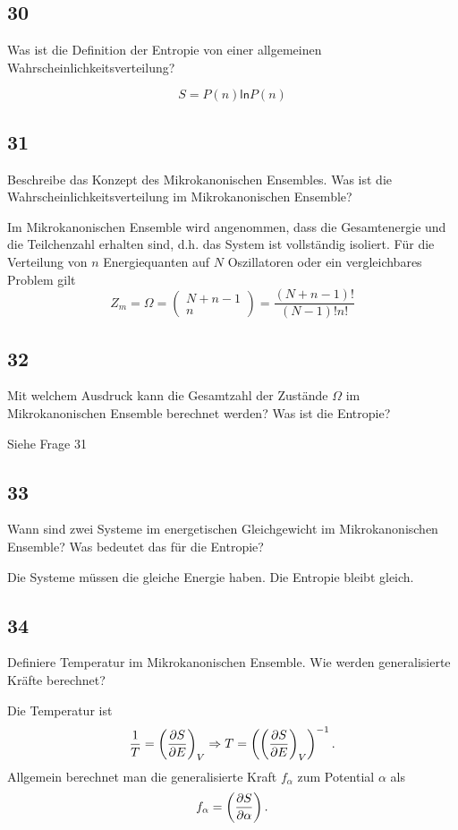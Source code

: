 \documentclass[12pt,a4paper]{report}
\newcommand{\logn}{\mathsf{ln}}
\newcommand{\partdd}[2]{\ensuremath {\left(\frac{\partial #1}{\partial #2}}\right)}
\newcommand{\partddd}[3]{\ensuremath {\left(\frac{\partial #1}{\partial #2}}\right)_{#3}}
\newcommand{\binkoef}[2]{\left(\begin{array}{c}{#1}\\{#2}\end{array}\right)}
\newenvironment{myfrag}{\begin{it}}{\end{it}\vspace{3mm}\par}
\numberwithin{equation}{section}
\begin{document}
\subsection{30}
\begin{myfrag}
Was ist die Definition der Entropie von einer allgemeinen Wahrscheinlichkeitsverteilung?
\end{myfrag}
\begin{equation}
	S=P(n)\logn P(n)
\end{equation}
\subsection{31}
\begin{myfrag}
Beschreibe das Konzept des Mikrokanonischen Ensembles. Was ist die
Wahrscheinlichkeitsverteilung im Mikrokanonischen Ensemble?
\end{myfrag}
Im Mikrokanonischen Ensemble wird angenommen, dass die Gesamtenergie und die Teilchenzahl erhalten sind, d.h. das System ist vollständig isoliert. Für die Verteilung von $n$ Energiequanten auf $N$ Oszillatoren oder ein vergleichbares Problem gilt
\begin{equation}
	Z_m=\Omega=\binkoef{N+n-1}{n}=\frac{(N+n-1)!}{(N-1)!n!}
\end{equation}
\subsection{32}
\begin{myfrag}
Mit welchem Ausdruck kann die Gesamtzahl der Zustände $\Omega$ im
Mikrokanonischen Ensemble berechnet werden? Was ist die Entropie?
\end{myfrag}
Siehe Frage 31 %
\subsection{33}
\begin{myfrag}
Wann sind zwei Systeme im energetischen Gleichgewicht im Mikrokanonischen
Ensemble? Was bedeutet das für die Entropie?
\end{myfrag}
Die Systeme müssen die gleiche Energie haben. Die Entropie bleibt gleich. %
\subsection{34}
\begin{myfrag}
Definiere Temperatur im Mikrokanonischen Ensemble. Wie werden
generalisierte Kräfte berechnet?
\end{myfrag}
Die Temperatur ist
\begin{equation}
	\frac{1}{T}=\partddd SEV \Rightarrow T=\left(\partddd SEV\right)^{-1}.
\end{equation}
Allgemein berechnet man die generalisierte Kraft $f_\alpha$ zum Potential $\alpha$ als
\begin{equation}
	f_\alpha=\partdd S\alpha .
\end{equation}
\end{document}
